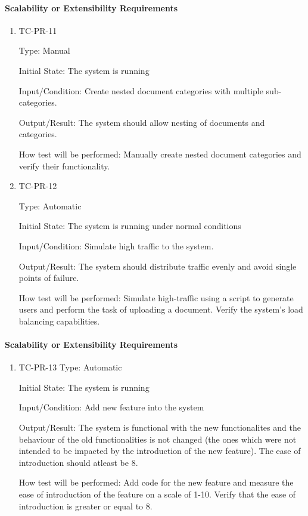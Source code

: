 \documentclass[12pt, titlepage]{article}
\begin{document}
\paragraph{Scalability or Extensibility Requirements}
\begin{enumerate}
  \item {TC-PR-11\\}

    Type: Manual

    Initial State: The system is running

    Input/Condition: Create nested document categories with multiple 
    sub-categories.

    Output/Result: The system should allow nesting of documents and categories.

    How test will be performed: Manually create nested document categories and
    verify their functionality.

    \item {TC-PR-12\\}

    Type: Automatic

    Initial State: The system is running under normal conditions

    Input/Condition: Simulate high traffic to the system.

    Output/Result: The system should distribute traffic evenly and avoid single
    points of failure.

    How test will be performed: Simulate high-traffic using a script to generate
    users and perform the task of uploading a document. Verify the system's load
    balancing capabilities.

\end{enumerate}

\paragraph{Scalability or Extensibility Requirements}
\begin{enumerate}

  \item {TC-PR-13}
  Type: Automatic

  Initial State: The system is running

  Input/Condition: Add new feature into the system

  Output/Result: The system is functional with the new functionalites and the
  behaviour of the old functionalities is not changed (the ones which 
  were not intended to be impacted by the introduction of the new feature).
  The ease of introduction should atleast be 8.

  How test will be performed: Add code for the new feature and measure the ease
  of introduction of the feature on a scale of 1-10. Verify that the ease of
  introduction is greater or equal to 8.
\end{enumerate}
\end{document}

